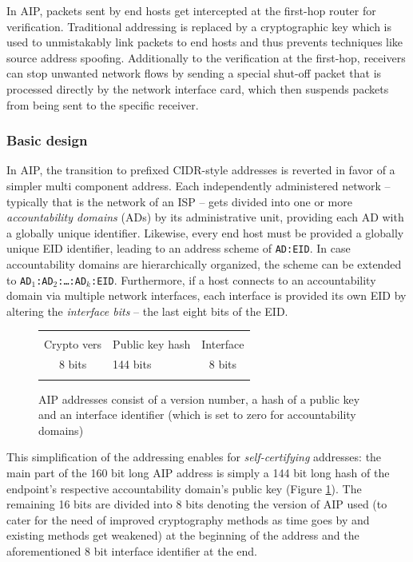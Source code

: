 \documentclass{acm_proc_article-sp}
\begin{document}
In AIP, packets sent by end hosts get intercepted at the first-hop router for verification. Traditional addressing is replaced by a cryptographic key which is used to unmistakably link packets to end hosts and thus prevents techniques like source address spoofing. Additionally to the verification at the first-hop, receivers can stop unwanted network flows by sending a special shut-off packet that is processed directly by the network interface card, which then suspends packets from being sent to the specific receiver.

\subsubsection{Basic design}
\label{sec:aipbd}

In AIP, the transition to prefixed CIDR-style addresses is reverted in favor of a simpler multi component address. Each independently administered network -- typically that is the network of an ISP -- gets divided into one or more \emph{accountability domains} (ADs) by its administrative unit, providing each AD with a globally unique identifier. Likewise, every end host must be provided a globally unique EID identifier, leading to an address scheme of \texttt{AD:EID}. In case accountability domains are hierarchically organized, the scheme can be extended to \texttt{AD$_1$:AD$_2$:\ldots:AD$_k$:EID}. Furthermore, if a host connects to an accountability domain via multiple network interfaces, each interface is provided its own EID by altering the \emph{interface bits} -- the last eight bits of the EID.

\begin{figure}[h!]
	\label{fig:aipadr}
	\begin{tabularx}{0.47\textwidth}{|c|C|c|}
		\hline & & \\
 		Crypto vers & Public key hash & Interface \\
		8 bits & 144 bits & 8 bits \\ & & \\
		\hline
	\end{tabularx}
	\caption{AIP addresses consist of a version number, a hash of a public key and an interface identifier 		(which is set to zero for accountability domains) \cite{aip}}
\end{figure}

This simplification of the addressing enables for \emph{self-certifying} addresses: the main part of the 160 bit long AIP address is simply a 144 bit long hash of the endpoint's respective accountability domain's public key (Figure \ref{fig:aipadr}). The remaining 16 bits are divided into 8 bits denoting the version of AIP used (to cater for the need of improved cryptography methods as time goes by and existing methods get weakened) at the beginning of the address and the aforementioned 8 bit interface identifier at the end.
\end{document}
